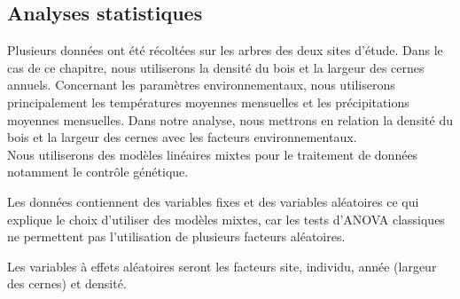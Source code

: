 \documentclass{report}
\begin{document}
\subsection*{Analyses statistiques}
Plusieurs données ont été récoltées sur les arbres des deux sites d'étude. Dans le cas de ce chapitre, nous utiliserons la densité du bois et la largeur des cernes annuels. Concernant les paramètres environnementaux, nous utiliserons principalement les températures moyennes mensuelles et les précipitations moyennes mensuelles. Dans notre analyse, nous mettrons en relation la densité du bois et la largeur des cernes avec les facteurs environnementaux. \\

%


Nous utiliserons des modèles linéaires mixtes pour le traitement de données notamment le contrôle génétique.

 Les données contiennent des variables fixes et des variables aléatoires ce qui explique le choix d'utiliser des modèles mixtes, car les tests d'ANOVA classiques ne permettent pas l'utilisation de plusieurs facteurs aléatoires.
 
Les variables à effets aléatoires seront les facteurs site, individu, année (largeur des cernes) et densité.


\end{document}
